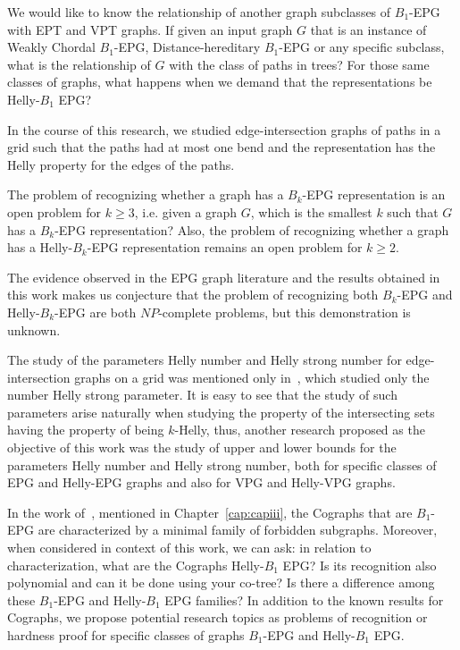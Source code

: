We would like to know the relationship of another graph subclasses of $B_1$-EPG with EPT and VPT graphs. If given an input graph $G$ that is an instance of Weakly Chordal $B_1$-EPG,  Distance-hereditary $B_1$-EPG or any specific subclass, what is the relationship of $G$ with the class of paths in trees? For those same classes of graphs, what happens when we demand that the representations be Helly-$B_1$ EPG?

In the course of this research, we studied edge-intersection graphs of paths in a grid such that the paths had at most one bend and the representation has the Helly property for the edges of the paths.

The problem of recognizing whether a graph has a  $B_{k}$-EPG representation is an open problem for $k\geq 3$, i.e. given a graph $ G$, which is the smallest $k$ such that $ G $ has a $ B_{k}$-EPG representation? Also, the problem of recognizing whether a graph has a  Helly-$B_{k}$-EPG representation remains an open problem for $ k\geq 2$.

The evidence observed in the EPG graph literature and the results obtained in this work makes us conjecture that the problem of recognizing both $B_{k}$-EPG and Helly-$B_{k}$-EPG  are both $NP$-complete problems, but this demonstration is unknown.

The study of the parameters Helly number and Helly strong number for edge-intersection graphs on a grid was mentioned only in~\cite{golumbic2009, golumbic2013}, which studied only the number Helly strong parameter. It is easy to see that the study of such parameters arise naturally when studying the property of the intersecting sets having the property of being $k$-Helly, thus, another research proposed as the objective of this work was the study of upper and lower bounds for the parameters Helly number and Helly strong number, both for specific classes of EPG and Helly-EPG graphs and also for VPG and Helly-VPG graphs.

In the work of~\citet{cohen2014}, mentioned in Chapter~\ref{cap:capiii}, the Cographs that are $B_1$-EPG are characterized by a minimal family of forbidden subgraphs. Moreover, when considered in context of this work, we can ask: in relation to characterization, what are the Cographs Helly-$B_1$  EPG? Is its recognition also polynomial and can it be done using your co-tree? Is there a difference among these $B_1$-EPG and Helly-$B_1$  EPG families? In addition to the known results for Cographs, we propose potential research topics as problems of recognition or hardness proof  for specific classes of graphs $B_1$-EPG and Helly-$B_1$ EPG.


